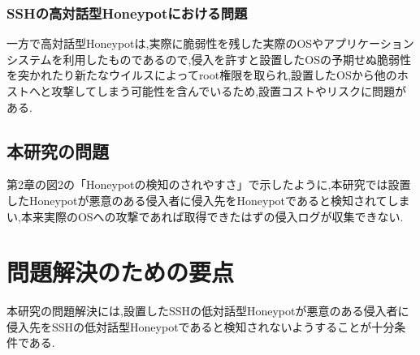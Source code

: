 \subsubsection{SSHの高対話型Honeypotにおける問題}
\label{approach:problemofSshHighHoneypot}
一方で高対話型Honeypotは,実際に脆弱性を残した実際のOSやアプリケーションシステムを利用したものであるので,侵入を許すと設置したOSの予期せぬ脆弱性を突かれたり新たなウイルスによってroot権限を取られ,設置したOSから他のホストへと攻撃してしまう可能性を含んでいるため,設置コストやリスクに問題がある.

\subsection{本研究の問題}
\label{approach:subproblem}
第2章の図2の「Honeypotの検知のされやすさ」で示したように,本研究では設置したHoneypotが悪意のある侵入者に侵入先をHoneypotであると検知されてしまい,本来実際のOSへの攻撃であれば取得できたはずの侵入ログが収集できない.

\section{問題解決のための要点}
\label{approach:YotenForProblem}
本研究の問題解決には,設置したSSHの低対話型Honeypotが悪意のある侵入者に侵入先をSSHの低対話型Honeypotであると検知されないようすることが十分条件である.

